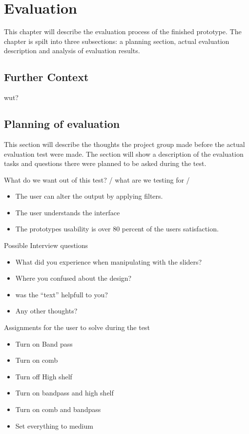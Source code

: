 \chapter{Evaluation}\label{ch:evaluation}
This chapter will describe the evaluation process of the finished prototype. The chapter is spilt into three subsections: a planning section, actual evaluation description and analysis of evaluation results. 

\section{Further Context}\label{sec:furthercontext}
 wut?

\section{Planning of evaluation}
This section will describe the thoughts the project group made before the actual evaluation test were made. The section will show a description of the evaluation tasks and questions there were planned to be asked during the test. 

What do we want out of this test? / what are we testing for / 

\begin{itemize}
\item The user can alter the output by applying filters.
\item The user understands the interface  
\item The prototypes usability is over 80 percent of the users satisfaction.
\end{itemize}

Possible Interview questions
\begin{itemize}
\item What did you experience when manipulating with the sliders?
\item Where you confused about the design?
\item was the “text” helpfull to you?
\item Any other thoughts?
\end{itemize}

Assignments for the user to solve during the test 
\begin{itemize}
\item Turn on Band pass 
\item Turn on  comb
\item Turn off High shelf 
\item Turn on bandpass and high shelf 
\item Turn on comb and bandpass 
\item Set everything to medium 
\end{itemize}


